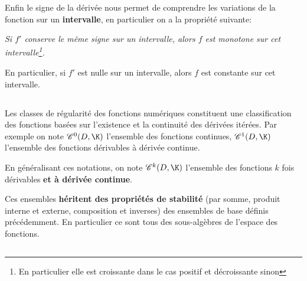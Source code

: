 Enfin le signe de la dérivée nous permet de comprendre les variations de la fonction sur un \textbf{intervalle}, en particulier on a la propriété suivante:
\begin{center}
   \textit{Si \(f'\) conserve le même signe sur un intervalle, alors \(f\) est monotone sur cet intervalle\footnote[2]{En particulier elle est croissante dans le cas positif et décroissante sinon}.}
\end{center}
En particulier, si \(f'\) est nulle sur un intervalle, alors \(f\) est constante sur cet intervalle.
\pagebreak 

\subsection*{}

Les classes de régularité des fonctions numériques constituent une classification des fonctions basées sur l'existence et la continuité des dérivées itérées.
Par exemple on note \(\mathscr{C}^0(D, \K)\) l'ensemble des fonctions continues, \(\mathscr{C}^1(D, \K)\) l'ensemble des fonctions dérivables à dérivée continue.\<

En généralisant ces notations, on note \(\mathscr{C}^k(D, \K)\) l'ensemble des fonctions \(k\) fois dérivables \textbf{et à dérivée continue}.\<

Ces ensembles \textbf{héritent des propriétés de stabilité} (par somme, produit interne et externe, composition et inverses) des ensembles de base définis précédemment. En particulier ce sont tous des sous-algèbres de l'espace des fonctions.

\subsection*{}

